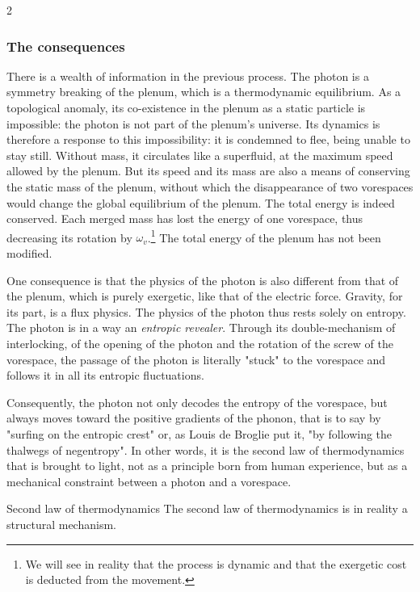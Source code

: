 \begin{multicols}{2}
	\subsubsection{The consequences}
	
	There is a wealth of information in the previous process. The photon is a 
	symmetry breaking of the plenum, which is a thermodynamic equilibrium. As 
	a topological anomaly, its co-existence in the plenum as a static 
	particle is impossible: the photon is not part of the plenum's universe. 
	Its dynamics is therefore a response to this impossibility: it is 
	condemned to flee, being unable to stay still. Without mass, it 
	circulates like a superfluid, at the maximum speed allowed by the plenum. 
	But its speed and its mass are also a means of conserving the static mass 
	of the plenum, without which the disappearance of two vorespaces would 
	change the global equilibrium of the plenum. The total energy is indeed 
	conserved. Each merged mass has lost the energy of one vorespace, thus 
	decreasing its rotation by $\omega_v$.\footnote{We will see in reality that 
		the process is dynamic and that the exergetic cost is deducted from the 
		movement.} The total energy of the plenum has not been modified.
	
	One consequence is that the physics of the photon is also different from 
	that of the plenum, which is purely exergetic, like that of the electric 
	force. Gravity, for its part, is a flux physics. The physics of the photon 
	thus rests solely on entropy. The photon is in a way an \textit{entropic 
		revealer}. Through its double-mechanism of interlocking, of the opening of 
	the photon and the rotation of the screw of the vorespace, the passage of 
	the photon is literally "stuck" to the vorespace and follows it in all its 
	entropic fluctuations. 
	
	Consequently, the photon not only decodes the entropy of the vorespace, but 
	always moves toward the positive gradients of the phonon, that is to say by 
	"surfing on the entropic crest" or, as Louis de Broglie put it, "by 
	following the thalwegs of negentropy". In other words, it is the second law 
	of thermodynamics that is brought to light, not as a principle born from 
	human experience, but as a mechanical constraint between a photon and a 
	vorespace. 
	
	\begin{mybox}[breakable,colback=blue!10, colbacktitle=pkcolor]{Second law of thermodynamics}
		The second law of thermodynamics is in reality a structural mechanism.
	\end{mybox}
	\medskip
	

\end{multicols}
